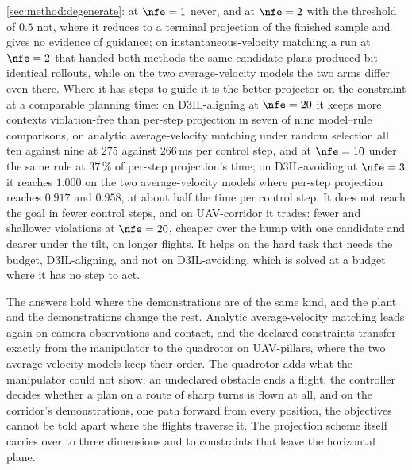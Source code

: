 \begin{description}
    \autoref{sec:method:degenerate}: at $\nfe = 1$ never, and at $\nfe = 2$ with the threshold of
    $0.5$ not, where it reduces to a terminal projection of the finished sample and gives no evidence
    of guidance; on instantaneous-velocity matching a run at $\nfe = 2$ that handed both methods the
    same candidate plans produced bit-identical rollouts, while on the two average-velocity models the
    two arms differ even there. Where it has steps to guide it is the better projector on the
    constraint at a comparable planning time: on D3IL-aligning at $\nfe = 20$ it keeps more contexts
    violation-free than per-step projection in seven of nine model--rule comparisons, on analytic
    average-velocity matching under random selection all ten against nine at $275$ against
    $266$\,ms per control step, and at $\nfe = 10$ under the same rule at $37\,\%$ of per-step
    projection's time; on D3IL-avoiding at $\nfe = 3$ it reaches $1.000$ on the two average-velocity
    models where per-step projection reaches $0.917$ and $0.958$, at about half the time per control
    step. It does not reach the goal in fewer control steps, and on UAV-corridor it trades: fewer and
    shallower violations at $\nfe = 20$, cheaper over the hump with one candidate and dearer under
    the tilt, on longer flights. It helps on the hard task that needs the budget, D3IL-aligning, and
    not on D3IL-avoiding, which is solved at a budget where it has no step to act.
  \item[RQ3 --- Transfer.] The answers hold where the demonstrations are of the same kind, and the
    plant and the demonstrations change the rest. Analytic average-velocity matching leads again on
    camera observations and contact, and the declared constraints transfer exactly from the
    manipulator to the quadrotor on UAV-pillars, where the two average-velocity models keep their
    order. The quadrotor adds what the manipulator could not show: an undeclared obstacle ends a
    flight, the controller decides whether a plan on a route of sharp turns is flown at all, and on
    the corridor's demonstrations, one path forward from every position, the objectives cannot be
    told apart where the flights traverse it. The projection scheme itself carries over to three
    dimensions and to constraints that leave
    the horizontal plane.
\end{description}
